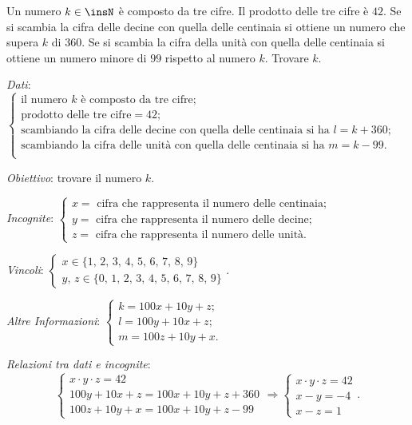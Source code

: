 \begin{problema}
Un numero $k\in \insN$ è composto da tre cifre. Il prodotto delle tre cifre è $42$. Se si scambia la cifra delle decine con quella delle centinaia si ottiene un numero che supera $k$ di $360$. Se si scambia la cifra della unità con quella delle centinaia si ottiene un numero minore di $99$ rispetto al numero $k$. Trovare $k$.
\end{problema}

\emph{Dati}: $\left\{\begin{array}{l}
\text{il numero } k \text{ è composto da tre cifre};\\
\text{prodotto delle tre cifre} = 42;\\
\text{scambiando la cifra delle decine con quella delle centinaia si ha }l=k+360; \\
\text{scambiando la cifra delle unità con quella delle centinaia si ha }m=k-99.\\
\end{array}\right.$

\emph{Obiettivo}: trovare il numero $k$.

\emph{Incognite}: $\left\{\begin{array}{l}
x=\text{ cifra che rappresenta il numero delle centinaia;}\\
y=\text{ cifra che rappresenta il numero delle decine;}\\
z=\text{ cifra che rappresenta il numero delle unità.}
\end{array}\right.$

\emph{Vincoli}: $\left\{\begin{array}{l}x\in \{1\text{, }2\text{, }3\text{, }4\text{, }5\text{, }6\text{, }7\text{, }8\text{, }9\} \\y\text{, }z\in \{0\text{, }1\text{, }2\text{, }3\text{, }4\text{, }5\text{, }6\text{, }7\text{, }8\text{, }9\}\end{array}\right.$.

\emph{Altre Informazioni}: $\left\{\begin{array}{l}
k=100x+10y+z;\\
l=100y+10x+z;\\
m=100z+10y+x.
\end{array}\right.$

\emph{Relazioni tra dati e incognite}: \[ \left\{\begin{array}{l}x\cdot y\cdot z=42 \\100y+10x+z=100x+10y+z+360\\100z+10y+x=100x+10y+z-99 \end{array}\right.\Rightarrow \left\{\begin{array}{l}x\cdot y\cdot z=42 \\x-y=-4\\x-z=1\end{array}\right.. \]

